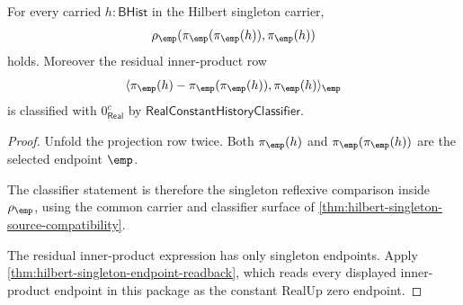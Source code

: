 \begin{theorem}
\label{thm:hilbert-singleton-projection-idempotence}
For every carried $h:\mathsf{BHist}$ in the Hilbert singleton carrier,
$$
\rho_{\emp}(\pi_{\emp}(\pi_{\emp}(h)),\pi_{\emp}(h))
$$
holds. Moreover the residual inner-product row
$$
\langle \pi_{\emp}(h)-\pi_{\emp}(\pi_{\emp}(h)),\pi_{\emp}(h)\rangle_{\emp}
$$
is classified with $0_{\mathsf{Real}}^{c}$ by
$\mathsf{RealConstantHistoryClassifier}$.
\end{theorem}
\begin{proof}
Unfold the projection row twice. Both $\pi_{\emp}(h)$ and
$\pi_{\emp}(\pi_{\emp}(h))$ are the selected endpoint $\emp$.

The classifier statement is therefore the singleton reflexive comparison
inside $\rho_{\emp}$, using the common carrier and classifier surface of
\autoref{thm:hilbert-singleton-source-compatibility}.

The residual inner-product expression has only singleton endpoints. Apply
\autoref{thm:hilbert-singleton-endpoint-readback}, which reads every displayed
inner-product endpoint in this package as the constant RealUp zero endpoint.
\end{proof}

